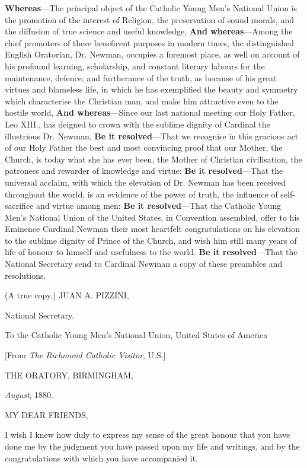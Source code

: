 \textbf{Whereas}—The principal object of the Catholic Young Men's
National Union is the promotion of the interest of Religion, the
preservation of sound morals, and the diffusion of true science and
useful knowledge,
\textbf{And whereas}—Among the chief promoters of these beneficent
purposes in modern times, the distinguished English Oratorian, Dr.
Newman, occupies a foremost place, as well on account of his profound learning, scholarship, and constant literary labours for the
maintenance, defence, and furtherance of the truth, as because of his
great virtues and blameless life, in which he has exemplified the
beauty and symmetry which characterise the Christian man, and make him
attractive even to the hostile world,
\textbf{And whereas}—Since our last national meeting our Holy Father,
Leo XIII., has deigned to crown with the sublime dignity of Cardinal
the illustrious Dr. Newman,
\textbf{Be it resolved}—That we recognise in this gracious act of our
Holy Father the best and most convincing proof that our Mother, the
Church, is today what she has ever been, the Mother of Christian
civilisation, the patroness and rewarder of knowledge and virtue:
\textbf{Be it resolved}—That the universal acclaim, with which the
elevation of Dr. Newman has been received throughout the world, is an
evidence of the power of truth, the influence of self-sacrifice and
virtue among men:
\textbf{Be it resolved}—That the Catholic Young Men's National Union
of the United States, in Convention assembled, offer to his Eminence
Cardinal Newman their most heartfelt congratulations on his elevation
to the sublime dignity of Prince of the Church, and wish him still
many years of life of honour to himself and usefulness to the world.
\textbf{Be it resolved}—That the National Secretary send to
Cardinal Newman a copy of these preambles and resolutions.

(A true copy.) JUAN A. PIZZINI,

National Secretary.

To the Catholic Young Men's National Union, United States of
America

[From \emph{The Richmond Catholic Visitor}, U.S.]

THE ORATORY, BIRMINGHAM,

\emph{August}, 1880.

MY DEAR FRIENDS,

I wish I knew how duly to express my sense of the great honour that
you have done me by the judgment you have passed upon my life and
writings, and by the congratulations with which you have accompanied
it.


